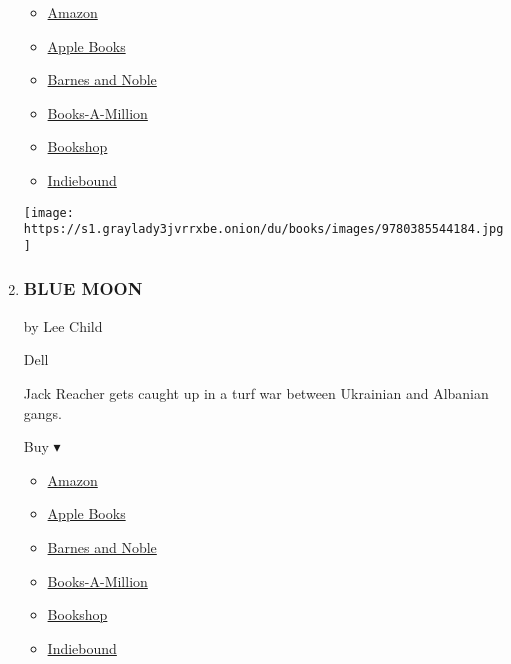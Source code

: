 \begin{enumerate}
  \begin{itemize}
  \tightlist
  \item
    \href{https://www.amazon.com/Guardians-Novel-John-Grisham/dp/0385544189?tag=NYTBS-20}{Amazon}
  \item
    \href{https://du-gae-books-dot-nyt-du-prd.appspot.com/buy?title=THE+GUARDIANS\&author=John+Grisham}{Apple
    Books}
  \item
    \href{https://www.anrdoezrs.net/click-7990613-11819508?url=https\%3A\%2F\%2Fwww.barnesandnoble.com\%2Fw\%2F\%3Fean\%3D9780525620945}{Barnes
    and Noble}
  \item
    \href{https://www.anrdoezrs.net/click-7990613-35140?url=https\%3A\%2F\%2Fwww.booksamillion.com\%2Fp\%2FTHE\%2BGUARDIANS\%2FJohn\%2BGrisham\%2F9780525620945}{Books-A-Million}
  \item
    \href{https://bookshop.org/a/3546/9780525620945}{Bookshop}
  \item
    \href{https://www.indiebound.org/book/9780525620945?aff=NYT}{Indiebound}
  \end{itemize}

  \texttt{[image: https://s1.graylady3jvrrxbe.onion/du/books/images/9780385544184.jpg]}
\item
  \hypertarget{blue-moon}{%
  \subsubsection{BLUE MOON}\label{blue-moon}}

  by Lee Child

  Dell

  Jack Reacher gets caught up in a turf war between Ukrainian and
  Albanian gangs.

  Buy ▾

  \begin{itemize}
  \tightlist
  \item
    \href{https://www.amazon.com/Blue-Moon-Jack-Reacher-Novel/dp/0399593543?tag=NYTBS-20}{Amazon}
  \item
    \href{https://du-gae-books-dot-nyt-du-prd.appspot.com/buy?title=BLUE+MOON\&author=Lee+Child}{Apple
    Books}
  \item
    \href{https://www.anrdoezrs.net/click-7990613-11819508?url=https\%3A\%2F\%2Fwww.barnesandnoble.com\%2Fw\%2F\%3Fean\%3D9780399593567}{Barnes
    and Noble}
  \item
    \href{https://www.anrdoezrs.net/click-7990613-35140?url=https\%3A\%2F\%2Fwww.booksamillion.com\%2Fp\%2FBLUE\%2BMOON\%2FLee\%2BChild\%2F9780399593567}{Books-A-Million}
  \item
    \href{https://bookshop.org/a/3546/9780399593567}{Bookshop}
  \item
    \href{https://www.indiebound.org/book/9780399593567?aff=NYT}{Indiebound}
  \end{itemize}


\end{enumerate}
